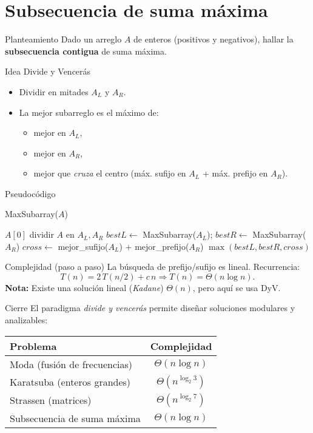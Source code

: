 \documentclass[aspectratio=169]{beamer}
\begin{document}
\section{Subsecuencia de suma máxima}
\begin{frame}{Planteamiento}
Dado un arreglo $A$ de enteros (positivos y negativos), hallar la \textbf{subsecuencia contigua} de suma máxima.
\end{frame}

\begin{frame}{Idea Divide y Vencerás}
\begin{itemize}
  \item Dividir en mitades $A_L$ y $A_R$.
  \item La mejor subarreglo es el máximo de:
  \begin{itemize}
    \item mejor en $A_L$,
    \item mejor en $A_R$,
    \item mejor que \emph{cruza} el centro (máx. sufijo en $A_L$ + máx. prefijo en $A_R$).
  \end{itemize}
\end{itemize}
\end{frame}

\begin{frame}{Pseudocódigo}
\begin{algorithm}[H]
\caption{MaxSubarray($A$)}
\begin{algorithmic}[1]
 \State \Return $A[0]$
\EndIf
\State dividir $A$ en $A_L, A_R$
\State $bestL \gets$ MaxSubarray($A_L$); \quad $bestR \gets$ MaxSubarray($A_R$)
\State $cross \gets$ mejor\_sufijo($A_L$) $+$ mejor\_prefijo($A_R$)
\State \Return $\max(bestL, bestR, cross)$
\end{algorithmic}
\end{algorithm}
\end{frame}

\begin{frame}{Complejidad (paso a paso)}
La búsqueda de prefijo/sufijo es lineal. Recurrencia:
\[ T(n) = 2\,T(n/2) + c\,n \Rightarrow T(n)=\Theta(n\log n).\]
\textbf{Nota:} Existe una solución lineal (\emph{Kadane}) $\Theta(n)$, pero aquí se usa DyV.
\end{frame}

\begin{frame}{Cierre}
El paradigma \emph{divide y vencerás} permite diseñar soluciones modulares y analizables: \\[0.5ex]
\begin{tabular}{l|c}
\textbf{Problema} & \textbf{Complejidad} \\ \hline
Moda (fusión de frecuencias) & $\Theta(n\log n)$ \\
Karatsuba (enteros grandes) & $\Theta(n^{\log_2 3})$ \\
Strassen (matrices) & $\Theta(n^{\log_2 7})$ \\
Subsecuencia de suma máxima & $\Theta(n\log n)$ \\
\end{tabular}
\end{frame}
\end{document}
